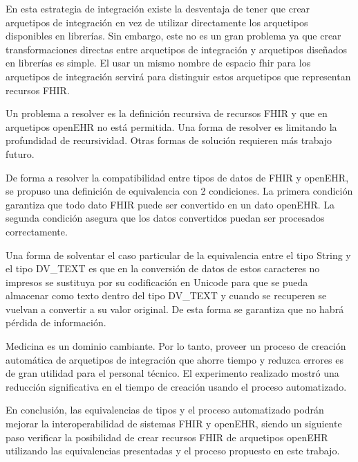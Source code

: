 En esta estrategia de integración existe la desventaja de tener que crear arquetipos de integración en vez de utilizar directamente los arquetipos disponibles en librerías. Sin embargo, este no es un gran problema ya que crear transformaciones directas entre arquetipos de integración y arquetipos diseñados en librerías es simple. El usar un mismo nombre de espacio fhir para los arquetipos de integración servirá para distinguir estos arquetipos que representan recursos FHIR.

Un problema a resolver es la definición recursiva de recursos FHIR y que en arquetipos openEHR no está permitida. Una forma de resolver es limitando la profundidad de recursividad. Otras formas de solución requieren más trabajo futuro.

De forma a resolver la compatibilidad entre tipos de datos de FHIR y openEHR, se propuso una definición de equivalencia con 2 condiciones. La primera condición garantiza que todo dato FHIR puede ser convertido en un dato openEHR. La segunda condición asegura que los datos convertidos puedan ser procesados correctamente.

Una forma de solventar el caso particular de la equivalencia entre el tipo String y el tipo DV\_TEXT es que en la conversión de datos de estos caracteres no impresos se sustituya por su codificación en Unicode para que se pueda almacenar como texto dentro del tipo DV\_TEXT y cuando se recuperen se vuelvan a convertir a su valor original. De esta forma se garantiza que no habrá pérdida de información.

Medicina es un dominio cambiante. Por lo tanto, proveer un proceso de creación automática de arquetipos de integración que ahorre tiempo y reduzca errores es de gran utilidad para el personal técnico. El experimento realizado mostró una reducción significativa en el tiempo de creación usando el proceso automatizado.

En conclusión, las equivalencias de tipos y el proceso automatizado podrán mejorar la interoperabilidad de sistemas FHIR y openEHR, siendo un siguiente paso verificar la posibilidad de crear recursos FHIR de arquetipos openEHR utilizando las equivalencias presentadas y el proceso propuesto en este trabajo.
